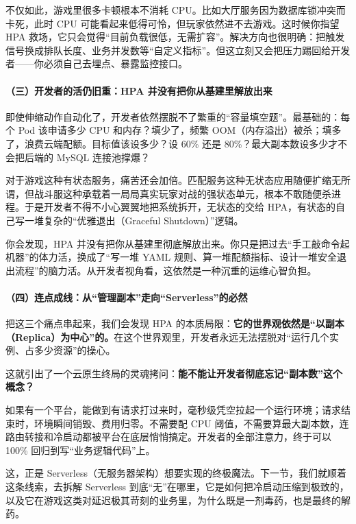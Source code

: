 不仅如此，游戏里很多卡顿根本不消耗 CPU。比如大厅服务因为数据库锁冲突而卡死，此时 CPU 可能看起来低得可怜，但玩家依然进不去游戏。这时候你指望 HPA 救场，它只会觉得“目前负载很低，无需扩容”。解决方向也很明确：把触发信号换成排队长度、业务并发数等“自定义指标”。但这立刻又会把压力踢回给开发者——你必须自己去埋点、暴露监控接口。

\paragraph{（三）开发者的活仍旧重：HPA 并没有把你从基建里解放出来}

即使伸缩动作自动化了，开发者依然摆脱不了繁重的“容量填空题”。最基础的：每个 Pod 该申请多少 CPU 和内存？填少了，频繁 OOM（内存溢出）被杀；填多了，浪费云端配额。目标值该设多少？设 60\% 还是 80\%？最大副本数设多少才不会把后端的 MySQL 连接池撑爆？

对于游戏这种有状态服务，痛苦还会加倍。匹配服务这种无状态应用随便扩缩无所谓，但战斗服这种承载着一局局真实玩家对战的强状态单元，根本不敢随便杀进程。于是开发者不得不小心翼翼地把系统拆开，无状态的交给 HPA，有状态的自己写一堆复杂的“优雅退出（Graceful Shutdown）”逻辑。

你会发现，HPA 并没有把你从基建里彻底解放出来。你只是把过去“手工敲命令起机器”的体力活，换成了“写一堆 YAML 规则、算一堆配额指标、设计一堆安全退出流程”的脑力活。从开发者视角看，这依然是一种沉重的运维心智负担。

\paragraph{（四）连点成线：从“管理副本”走向“Serverless”的必然}

把这三个痛点串起来，我们会发现 HPA 的本质局限：\textbf{它的世界观依然是“以副本（Replica）为中心”的。}在这个世界观里，开发者永远无法摆脱对“运行几个实例、占多少资源”的操心。

这就引出了一个云原生终局的灵魂拷问：\textbf{能不能让开发者彻底忘记“副本数”这个概念？}

如果有一个平台，能做到有请求打过来时，毫秒级凭空拉起一个运行环境；请求结束时，环境瞬间销毁、费用归零。不需要配 CPU 阈值，不需要算最大副本数，连路由转接和冷启动都被平台在底层悄悄搞定。开发者的全部注意力，终于可以 100\% 回归到写“业务逻辑代码”上。

这，正是 Serverless（无服务器架构）想要实现的终极魔法。下一节，我们就顺着这条线索，去拆解 Serverless 到底“无”在哪里，它是如何把冷启动压缩到极致的，以及它在游戏这类对延迟极其苛刻的业务里，为什么既是一剂毒药，也是最终的解药。


